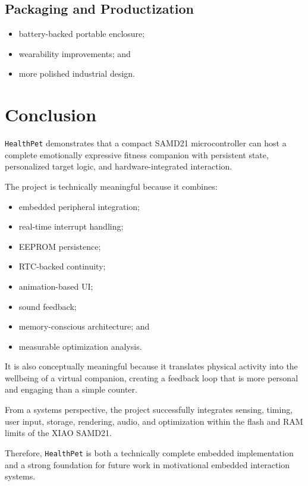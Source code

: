 \documentclass[conference]{IEEEtran}
\begin{document}
\subsection{Packaging and Productization}
\begin{itemize}
\item battery-backed portable enclosure;
\item wearability improvements; and
\item more polished industrial design.
\end{itemize}

\section{Conclusion}
\texttt{HealthPet} demonstrates that a compact SAMD21 microcontroller can host a complete emotionally expressive fitness companion with persistent state, personalized target logic, and hardware-integrated interaction.

The project is technically meaningful because it combines:
\begin{itemize}
\item embedded peripheral integration;
\item real-time interrupt handling;
\item EEPROM persistence;
\item RTC-backed continuity;
\item animation-based UI;
\item sound feedback;
\item memory-conscious architecture; and
\item measurable optimization analysis.
\end{itemize}

It is also conceptually meaningful because it translates physical activity into the wellbeing of a virtual companion, creating a feedback loop that is more personal and engaging than a simple counter.

From a systems perspective, the project successfully integrates sensing, timing, user input, storage, rendering, audio, and optimization within the flash and RAM limits of the XIAO SAMD21.

Therefore, \texttt{HealthPet} is both a technically complete embedded implementation and a strong foundation for future work in motivational embedded interaction systems.
\end{document}
